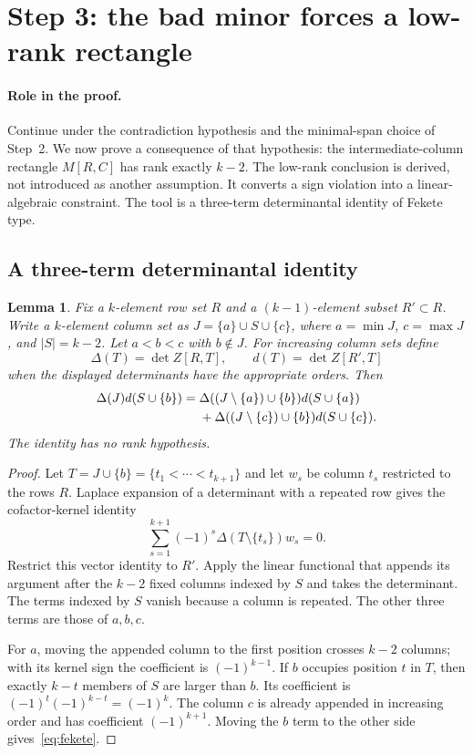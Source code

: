 \documentclass[10pt,a4paper]{article}
\newtheorem{lemma}[theorem]{Lemma}
\theoremstyle{definition}
\theoremstyle{remark}
\numberwithin{equation}{section}
\begin{document}
\section{Step 3: the bad minor forces a low-rank rectangle}\label{sec:rank}

\paragraph{Role in the proof.}
Continue under the contradiction hypothesis and the minimal-span choice of
Step~2. We now prove a consequence of that hypothesis: the
intermediate-column rectangle $M[R,C]$ has rank exactly $k-2$. The
low-rank conclusion is derived, not introduced as another assumption. It
converts a sign violation into a linear-algebraic constraint. The tool is
a three-term determinantal identity of Fekete type.

\subsection{A three-term determinantal identity}

\begin{lemma}\label{lem:fekete}
Fix a $k$-element row set $R$ and a $(k-1)$-element subset
$R'\subset R$. Write a $k$-element column set as
$J=\{a\}\cup S\cup\{c\}$, where $a=\min J$, $c=\max J$,
and $|S|=k-2$. Let $a<b<c$ with $b\notin J$. For increasing
column sets define
\[
 \Delta(T)=\det Z[R,T],\qquad d(T)=\det Z[R',T]
\]
when the displayed determinants have the appropriate orders.
Then
\begin{align}
 \Delta(J)d(S\cup\{b\})
 ={}&\Delta((J\setminus\{a\})\cup\{b\})d(S\cup\{a\})\notag\\
 &+\Delta((J\setminus\{c\})\cup\{b\})d(S\cup\{c\}).
 \label{eq:fekete}
\end{align}
The identity has no rank hypothesis.
\end{lemma}

\begin{proof}
Let $T=J\cup\{b\}=\{t_1<\cdots<t_{k+1}\}$ and let $w_s$
be column $t_s$ restricted to the rows $R$. Laplace expansion of
a determinant with a repeated row gives the cofactor-kernel
identity
\[
 \sum_{s=1}^{k+1}(-1)^s\Delta(T\setminus\{t_s\})w_s=0.
\]
Restrict this vector identity to $R'$. Apply the linear functional
that appends its argument after the $k-2$ fixed columns indexed
by $S$ and takes the determinant. The terms indexed by $S$
vanish because a column is repeated. The other three terms are
those of $a,b,c$.

For $a$, moving the appended column to the first position crosses
$k-2$ columns; with its kernel sign the coefficient is
$(-1)^{k-1}$. If $b$ occupies position $t$ in $T$, then exactly
$k-t$ members of $S$ are larger than $b$. Its coefficient is
$(-1)^t(-1)^{k-t}=(-1)^k$. The column $c$ is already appended
in increasing order and has coefficient $(-1)^{k+1}$. Moving
the $b$ term to the other side gives~\eqref{eq:fekete}.
\end{proof}
\end{document}
